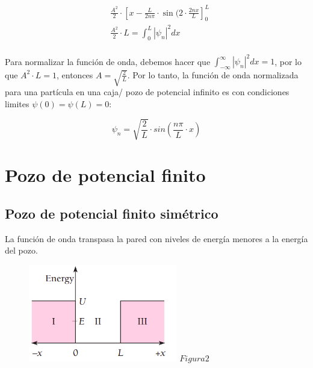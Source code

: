 \documentclass[a4paper]{article}
\begin{document}
        \saltoPag

        \vspace{-1mm}

        \begin{align*}
            &\frac{A^{2}}{2} \cdot \left[ x - \frac{L}{2n\pi} \cdot \sin(2 \cdot \frac{2nx}{L} \right]_{0}^{L} \\
            &\frac{A^{2}}{2} \cdot L = \int_{0}^{L} \left| \psi_n \right|^{2} dx \\
        \end{align*}

        \indent Para normalizar la función de onda, debemos hacer que $\int_{-\infty}^{\infty} \left| \psi_n \right|^{2} dx = 1$, por lo que $A^{2} \cdot L = 1$, entonces $A = \sqrt{\frac{2}{L}}$. Por lo tanto, la función de onda normalizada para una partícula en una caja/ pozo de potencial infinito es con condiciones limites $\psi(0) = \psi(L) = 0$:

        \begin{equation}
            \psi_n = \sqrt{\frac{2}{L}} \cdot sin(\frac{n\pi}{L} \cdot x)
        \end{equation}
    

        \section{Pozo de potencial finito}

            \subsection{Pozo de potencial finito simétrico}

            \indent La función de onda transpasa la pared con niveles de energía menores a la energía del pozo.

            \begin{figure}[h!]
                \centering
                \includegraphics[width=6.5cm]{../../imagenes/pozo_potencial_finito.png}
                \vspace{-0.5mm}
                \textbf{$Figura 2$}
            \end{figure}
\end{document}
